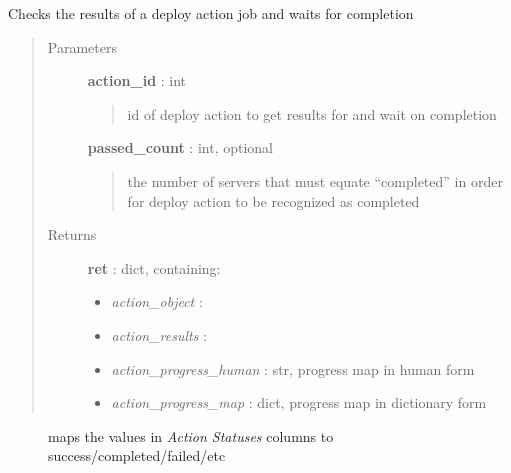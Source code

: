 \documentclass[letterpaper,10pt,english]{sphinxmanual}
\begin{document}
\begin{fulllineitems}
\label{pytan.handler:pytan.handler.Handler.deploy_action_asker}
Checks the results of a deploy action job and waits for completion
\begin{quote}\begin{description}
\item[{Parameters}] \leavevmode
\textbf{action\_id} : int
\begin{quote}

id of deploy action to get results for and wait on completion
\end{quote}

\textbf{passed\_count} : int, optional
\begin{quote}

the number of servers that must equate ``completed'' in order for deploy action to be recognized as completed
\end{quote}

\item[{Returns}] \leavevmode
\textbf{ret} : dict, containing:
\begin{itemize}
\item {} 
\emph{action\_object} : {\hyperref[taniumpy.object_types:taniumpy.object_types.action.Action]{}}

\item {} 
\emph{action\_results} : {\hyperref[taniumpy.object_types:taniumpy.object_types.result_set.ResultSet]{}}

\item {} 
\emph{action\_progress\_human} : str, progress map in human form

\item {} 
\emph{action\_progress\_map} : dict, progress map in dictionary form

\end{itemize}

\end{description}\end{quote}



\begin{description}
\item[{{\hyperref[pytan.constants:pytan.constants.ACTION_RESULT_STATUS]{}}}] \leavevmode
maps the values in \emph{Action Statuses} columns to success/completed/failed/etc

\end{description}



\end{fulllineitems}
\end{document}

